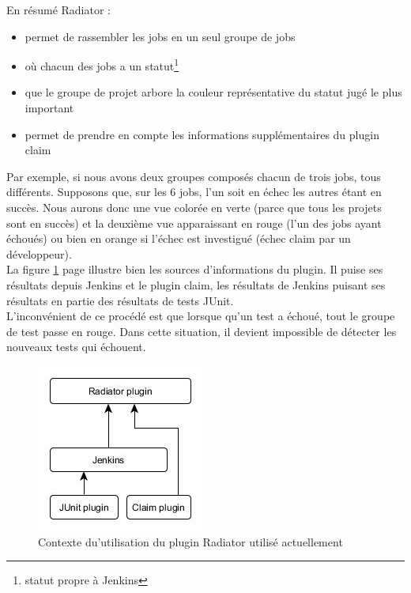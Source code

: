 En résumé Radiator :
\begin{itemize}
	\item permet de rassembler les jobs en un seul groupe de jobs
	\item où chacun des jobs a un statut\footnote{statut propre à Jenkins}
	\item que le groupe de projet arbore la couleur représentative du statut jugé le plus important
	\item permet de prendre en compte les informations supplémentaires du plugin claim
\end{itemize}
Par exemple, si nous avons deux groupes composés chacun de trois jobs, tous différents. Supposons que, sur les 6 jobs, l'un soit en échec les autres étant en succès. Nous aurons donc une vue colorée en verte (parce que tous les projets sont en succès) et la deuxième vue apparaissant en rouge (l'un des jobs ayant échoués) ou bien en orange si l'échec est investigué (échec claim par un développeur).\\
La figure \ref{figure:RadiatorInformationSources} page \pageref{figure:RadiatorInformationSources} illustre bien les sources d'informations du plugin. Il puise ses résultats depuis Jenkins et le plugin claim, les résultats de Jenkins puisant ses résultats en partie des résultats de tests JUnit.\\
L'inconvénient de ce procédé est que lorsque qu'un test a échoué, tout le groupe de test passe en rouge. Dans cette situation, il devient impossible de détecter les nouveaux tests qui échouent.




\begin{figure}[!h]
  \centering
      \includegraphics[scale=0.5]{images/RadiatorInformationSources.jpg}
  \caption{Contexte du'utilisation du plugin Radiator utilisé actuellement}
	\label{figure:RadiatorInformationSources}
\end{figure}





